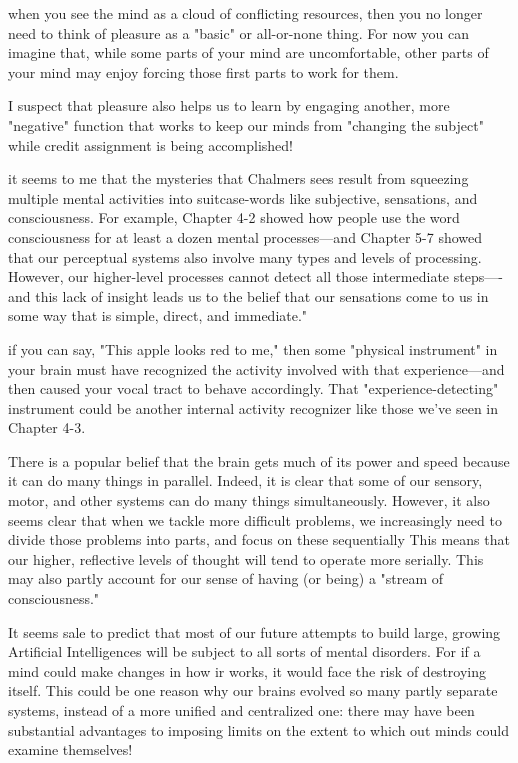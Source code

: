 \documentclass[10pt,a4paper]{article}
\begin{document}
when you see the mind as a cloud of conflicting resources, then you no longer need to think of pleasure as a "basic" or all-or-none thing. For now you can imagine that, while some parts of your mind are uncomfortable, other parts of your mind may enjoy forcing those first parts to work for them. \cite[p.~325]{minsky}

I suspect that pleasure also helps us to learn by engaging another, more "negative" function that works to keep our minds from "changing the subject" while credit assignment is being accomplished! \cite[p.~326]{minsky}

it seems to me that the mysteries that Chalmers sees result from squeezing multiple mental activities into suitcase-words like subjective, sensations, and consciousness. For example, Chapter 4-2 showed how people use the word consciousness for at least a dozen mental processes—and Chapter 5-7 showed that our perceptual systems also involve many types and levels of processing. However, our higher-level processes cannot detect all those intermediate steps—-and this lack of insight leads us to the belief that our sensations come to us in some way that is simple, direct, and immediate." \cite[p.~327-328]{minsky}

if you can say, "This apple looks red to me," then some "physical instrument" in your brain must have recognized the activity involved with that experience—and then caused your vocal tract to behave accordingly. That "experience-detecting" instrument could be another internal activity recognizer like those we've seen in Chapter 4-3. \cite[p.~332]{minsky}

There is a popular belief that the brain gets much of its power and speed because it can do many things in parallel. Indeed, it is clear that some of our sensory, motor, and other systems can do many things simultaneously. However, it also seems clear that when we tackle more difficult problems, we increasingly need to divide those problems into parts, and focus on these sequentially This means that our higher, reflective levels of thought will tend to operate more serially. This may also partly account for our sense of having (or being) a "stream of consciousness." \cite[p.~337]{minsky}

It seems sale to predict that most of our future attempts to build large, growing Artificial Intelligences will be subject to all sorts of mental disorders. For if a mind could make changes in how ir works, it would face the risk of destroying itself. This could be one reason why our brains evolved so many partly separate systems, instead of a more unified and centralized one: there may have been substantial advantages to imposing limits on the extent to which out minds could examine themselves! \cite[p.~341]{minsky}
\end{document}

